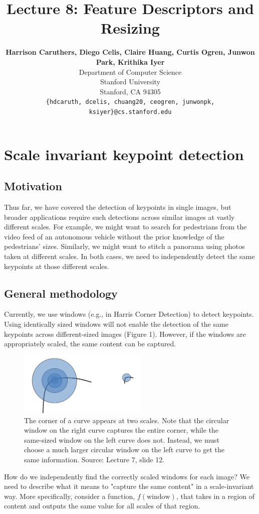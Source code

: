 \documentclass{article}
\title{Lecture 8: Feature Descriptors and Resizing}
\author{
  \textbf{Harrison Caruthers, Diego Celis, Claire Huang, Curtis Ogren, Junwon Park, Krithika Iyer} \\
  Department of Computer Science\\
  Stanford University\\
  Stanford, CA 94305 \\
  \texttt{\{hdcaruth, dcelis, chuang20, ceogren, junwonpk, ksiyer\}@cs.stanford.edu} \\
}
\begin{document}
\maketitle

\section{Scale invariant keypoint detection}
\subsection{Motivation}
Thus far, we have covered the detection of keypoints in single images, but broader applications require such detections across similar images at vastly different scales. For example, we might want to search for pedestrians from the video feed of an autonomous vehicle without the prior knowledge of the pedestrians' sizes. Similarly, we might want to stitch a panorama using photos taken at different scales. In both cases, we need to independently detect the same keypoints at those different scales.

\subsection{General methodology}
Currently, we use windows (e.g., in Harris Corner Detection) to detect keypoints. Using identically sized windows will not enable the detection of the same keypoints across different-sized images (Figure 1). However, if the windows are appropriately scaled, the same content can be captured.

\begin{figure}[h]
  \centering
  \includegraphics[width=0.55\textwidth]{corners}
  \caption{The corner of a curve appears at two scales. Note that the circular window on the right curve captures the entire corner, while the same-sized window on the left curve does not. Instead, we must choose a much larger circular window on the left curve to get the same information. Source: Lecture 7, slide 12.}
\end{figure}

How do we independently find the correctly scaled windows for each image? We need to describe what it means to "capture the same content" in a scale-invariant way. More specifically, consider a function, $f(\text{window})$, that takes in a region of content and outputs the same value for all scales of that region.
\end{document}
